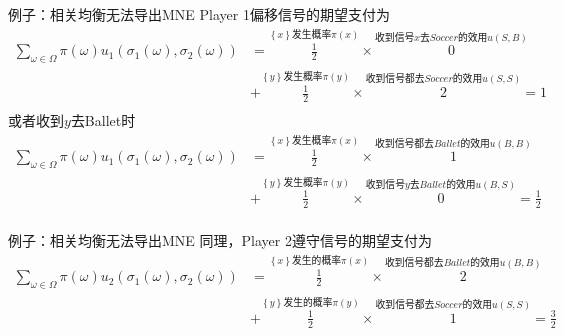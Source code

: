 \documentclass{beamer}
\begin{document}
\begin{frame}[label = correlated_equilibrium_to_MNE_2]{例子：相关均衡无法导出MNE}
	Player 1偏移信号的期望支付为
	\begin{equation*}
		\begin{aligned}
		\sum\limits_{\omega\in\Omega}\pi\left(\omega\right)u_{1}\left(\sigma_{1}\left(\omega\right),\sigma_{2}\left(\omega\right)\right)&=\overset{\left\lbrace x\right\rbrace \text{发生概率}\pi\left(x\right)}{\frac{1}{2}} \times \overset{\text{收到信号}x\text{去}Soccer\text{的效用}u\left(S,B\right)}{0}\\
		&+\overset{\left\lbrace y\right\rbrace \text{发生概率}\pi\left(y\right)}{\frac{1}{2}} \times \overset{\text{收到信号都去}Soccer\text{的效用}u\left(S,S\right)}{2}=1\\
		\end{aligned}
	\end{equation*}
	或者收到$y$去Ballet时
	\begin{equation*}
		\begin{aligned}
			\sum\limits_{\omega\in\Omega}\pi\left(\omega\right)u_{1}\left(\sigma_{1}\left(\omega\right),\sigma_{2}\left(\omega\right)\right)&=\overset{\left\lbrace x\right\rbrace \text{发生概率}\pi\left(x\right)}{\frac{1}{2}} \times \overset{\text{收到信号都去}Ballet\text{的效用}u\left(B,B\right)}{1}\\
			&+\overset{\left\lbrace y\right\rbrace \text{发生概率}\pi\left(y\right)}{\frac{1}{2}} \times \overset{\text{收到信号}y\text{去}Ballet\text{的效用}u\left(B,S\right)}{0}=\frac{1}{2}\\
		\end{aligned}
	\end{equation*}
\end{frame}

\begin{frame}[label = correlated_equilibrium_to_MNE_3]{例子：相关均衡无法导出MNE}
	同理，Player 2遵守信号的期望支付为
	\begin{equation*}
		\begin{aligned}
			\sum\limits_{\omega\in\Omega}\pi\left(\omega\right)u_{2}\left(\sigma_{1}\left(\omega\right),\sigma_{2}\left(\omega\right)\right)&=\overset{\left\lbrace x\right\rbrace \text{发生的概率}\pi\left(x\right)}{\frac{1}{2}} \times \overset{\text{收到信号都去}Ballet\text{的效用}u\left(B,B\right)}{2}\\
			&+\overset{\left\lbrace y\right\rbrace \text{发生的概率}\pi\left(y\right)}{\frac{1}{2}} \times \overset{\text{收到信号都去}Soccer\text{的效用}u\left(S,S\right)}{1}=\frac{3}{2}\\
		\end{aligned}
	\end{equation*}
\end{frame}
\end{document}
